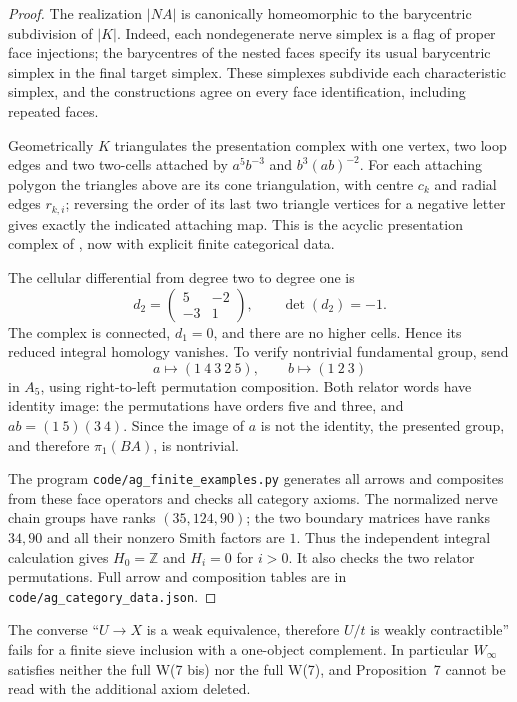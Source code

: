 \begin{proof}
The realization $|NA|$ is canonically homeomorphic to the barycentric subdivision of $|K|$. Indeed, each nondegenerate nerve simplex is a flag of proper face injections; the barycentres of the nested faces specify its usual barycentric simplex in the final target simplex. These simplexes subdivide each characteristic simplex, and the constructions agree on every face identification, including repeated faces.

Geometrically $K$ triangulates the presentation complex with one vertex, two loop edges and two two-cells attached by $a^5b^{-3}$ and $b^3(ab)^{-2}$. For each attaching polygon the triangles above are its cone triangulation, with centre $c_k$ and radial edges $r_{k,i}$; reversing the order of its last two triangle vertices for a negative letter gives exactly the indicated attaching map. This is the acyclic presentation complex of \citet[Example~2.38, p.~142]{Hatcher2002}, now with explicit finite categorical data.

The cellular differential from degree two to degree one is
\[
 d_2=\begin{pmatrix}5&-2\\-3&1\end{pmatrix},
 \qquad \det(d_2)=-1.
\]
The complex is connected, $d_1=0$, and there are no higher cells. Hence its reduced integral homology vanishes. To verify nontrivial fundamental group, send
\[
 a\longmapsto(1\ 4\ 3\ 2\ 5),\qquad
 b\longmapsto(1\ 2\ 3)
\]
in $A_5$, using right-to-left permutation composition. Both relator words have identity image: the permutations have orders five and three, and $ab=(1\ 5)(3\ 4)$. Since the image of $a$ is not the identity, the presented group, and therefore $\pi_1(BA)$, is nontrivial.

The program \texttt{code/ag\_finite\_examples.py} generates all arrows and composites from these face operators and checks all category axioms. The normalized nerve chain groups have ranks $(35,124,90)$; the two boundary matrices have ranks $34,90$ and all their nonzero Smith factors are $1$. Thus the independent integral calculation gives $H_0=\mathbb Z$ and $H_i=0$ for $i>0$. It also checks the two relator permutations. Full arrow and composition tables are in \texttt{code/ag\_category\_data.json}.
\end{proof}

\begin{theorem}\label{A:audit-prop7counter}
The converse ``$U\to X$ is a weak equivalence, therefore $U/t$ is weakly contractible'' fails for a finite sieve inclusion with a one-object complement. In particular $W_\infty$ satisfies neither the full W(7 bis) nor the full W(7), and Proposition~7 cannot be read with the additional axiom deleted.
\end{theorem}

